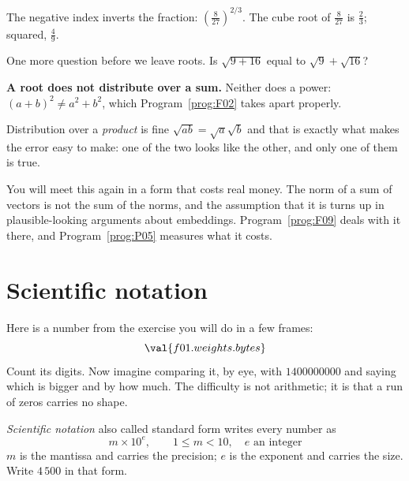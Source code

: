 \begin{fr}
\begin{ansblock}
The negative index inverts the fraction: $\left(\tfrac{8}{27}\right)^{2/3}$.
The cube root of $\tfrac{8}{27}$ is $\tfrac{2}{3}$; squared, $\tfrac{4}{9}$.
\end{ansblock}

One more question before we leave roots. Is $\sqrt{9 + 16}$ equal to
$\sqrt{9} + \sqrt{16}$?
\nextframe
\end{fr}

\begin{fr}
\begin{trapbox}
\textbf{A root does not distribute over a sum.} Neither does a power:
$(a+b)^{2} \ne a^{2} + b^{2}$, which Program~\ref{prog:F02} takes apart
properly.

Distribution over a \emph{product} is fine \dash{}
$\sqrt{ab} = \sqrt{a}\sqrt{b}$ \dash{} and that is exactly what makes the
error easy to make: one of the two looks like the other, and only one of them
is true.

You will meet this again in a form that costs real money. The norm of a sum of
vectors is not the sum of the norms, and the assumption that it is turns up in
plausible-looking arguments about embeddings. Program~\ref{prog:F09} deals with
it there, and Program~\ref{prog:P05} measures what it costs.
\end{trapbox}
\end{fr}

\section{Scientific notation}
\label{sec:F01-scientific}

\begin{fr}
Here is a number from the exercise you will do in a few frames:
\[ \val{f01.weights.bytes} \]
Count its digits. Now imagine comparing it, by eye, with $1400000000$ and
saying which is bigger and by how much. The difficulty is not arithmetic; it
is that a run of zeros carries no shape.

\emph{Scientific notation} \dash{} also called standard form \dash{} writes
every number as
\[ m \times 10^{e}, \qquad 1 \le m < 10, \quad e \text{ an integer} \]
$m$ is the mantissa and carries the precision; $e$ is the exponent and carries
the size. Write $4\,500$ in that form.
\nextframe
\end{fr}

